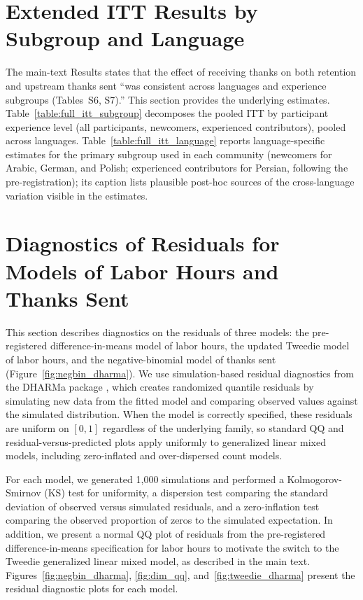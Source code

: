 \documentclass[9pt,twoside,lineno]{pnas-new}
\begin{document}
\section*{Extended ITT Results by Subgroup and Language}
The main-text Results states that the effect of receiving thanks on both retention and upstream thanks sent ``was consistent across languages and experience subgroups (Tables~S6, S7).'' This section provides the underlying estimates. Table~\ref{table:full_itt_subgroup} decomposes the pooled ITT by participant experience level (all participants, newcomers, experienced contributors), pooled across languages. Table~\ref{table:full_itt_language} reports language-specific estimates for the primary subgroup used in each community (newcomers for Arabic, German, and Polish; experienced contributors for Persian, following the pre-registration); its caption lists plausible post-hoc sources of the cross-language variation visible in the estimates.


\section*{Diagnostics of Residuals for Models of Labor Hours and Thanks Sent}

This section describes diagnostics on the residuals of three models: the pre-registered difference-in-means model of labor hours, the updated Tweedie model of labor hours, and the negative-binomial model of thanks sent (Figure~\ref{fig:negbin_dharma}). We use simulation-based residual diagnostics from the DHARMa package \cite{hartig_dharma_2022}, which creates randomized quantile residuals by simulating new data from the fitted model and comparing observed values against the simulated distribution. When the model is correctly specified, these residuals are uniform on $[0,1]$ regardless of the underlying family, so standard QQ and residual-versus-predicted plots apply uniformly to generalized linear mixed models, including zero-inflated and over-dispersed count models.

For each model, we generated 1{,}000 simulations and performed a Kolmogorov-Smirnov (KS) test for uniformity, a dispersion test comparing the standard deviation of observed versus simulated residuals, and a zero-inflation test comparing the observed proportion of zeros to the simulated expectation. In addition, we present a normal QQ plot of residuals from the pre-registered difference-in-means specification for labor hours to motivate the switch to the Tweedie generalized linear mixed model, as described in the main text. Figures~\ref{fig:negbin_dharma}, \ref{fig:dim_qq}, and~\ref{fig:tweedie_dharma} present the residual diagnostic plots for each model.
\end{document}
